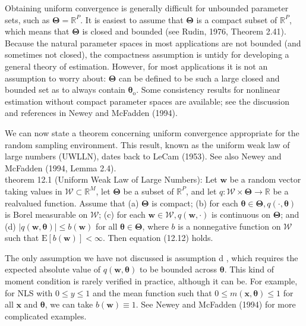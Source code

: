 \documentclass[10pt]{article}
\begin{document}
Obtaining uniform convergence is generally difficult for unbounded parameter sets, such as $\boldsymbol{\Theta}=\mathbb{R}^{P}$. It is easiest to assume that $\boldsymbol{\Theta}$ is a compact subset of $\mathbb{R}^{P}$, which means that $\boldsymbol{\Theta}$ is closed and bounded (see Rudin, 1976, Theorem 2.41). Because the natural parameter spaces in most applications are not bounded (and sometimes not closed), the compactness assumption is untidy for developing a general theory of estimation. However, for most applications it is not an assumption to worry about: $\boldsymbol{\Theta}$ can be defined to be such a large closed and bounded set as to always contain $\boldsymbol{\theta}_{\mathrm{o}}$. Some consistency results for nonlinear estimation without compact parameter spaces are available; see the discussion and references in Newey and McFadden (1994).

We can now state a theorem concerning uniform convergence appropriate for the random sampling environment. This result, known as the uniform weak law of large numbers (UWLLN), dates back to LeCam (1953). See also Newey and McFadden (1994, Lemma 2.4).\\
theorem 12.1 (Uniform Weak Law of Large Numbers): Let $\mathbf{w}$ be a random vector taking values in $\mathscr{W} \subset \mathbb{R}^{M}$, let $\boldsymbol{\Theta}$ be a subset of $\mathbb{R}^{P}$, and let $q: \mathscr{W} \times \boldsymbol{\Theta} \rightarrow \mathbb{R}$ be a realvalued function. Assume that (a) $\boldsymbol{\Theta}$ is compact; (b) for each $\boldsymbol{\theta} \in \boldsymbol{\Theta}, q(\cdot, \boldsymbol{\theta})$ is Borel measurable on $\mathscr{W}$; (c) for each $\mathbf{w} \in \mathscr{W}, q(\mathbf{w}, \cdot)$ is continuous on $\boldsymbol{\Theta}$; and (d) $|q(\mathbf{w}, \boldsymbol{\theta})| \leq b(\mathbf{w})$ for all $\boldsymbol{\theta} \in \boldsymbol{\Theta}$, where $b$ is a nonnegative function on $\mathscr{W}$ such that $\mathrm{E}[b(\mathbf{w})]<\infty$. Then equation (12.12) holds.

The only assumption we have not discussed is assumption d , which requires the expected absolute value of $q(\mathbf{w}, \boldsymbol{\theta})$ to be bounded across $\boldsymbol{\theta}$. This kind of moment condition is rarely verified in practice, although it can be. For example, for NLS with $0 \leq y \leq 1$ and the mean function such that $0 \leq m(\mathbf{x}, \boldsymbol{\theta}) \leq 1$ for all $\mathbf{x}$ and $\boldsymbol{\theta}$, we can take $b(\mathbf{w}) \equiv 1$. See Newey and McFadden (1994) for more complicated examples.
\end{document}
